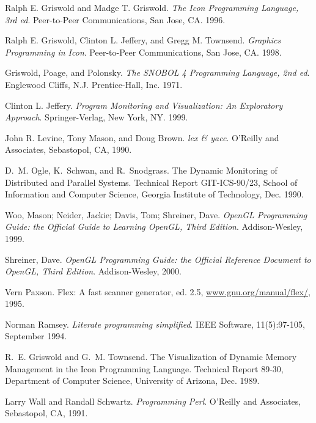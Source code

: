 \begin{thebibliography}{ABCD}
   Ralph E. Griswold and Madge T. Griswold.
    \emph{The Icon Programming Language, 3rd ed}. Peer-to-Peer Communications,
    San Jose, CA. 1996.

   Ralph E. Griswold, Clinton L. Jeffery, and Gregg
    M. Townsend. \emph{Graphics Programming in Icon}. Peer-to-Peer
    Communications, San Jose, CA. 1998.

   Griswold, Poage, and Polonsky.
    \emph{The SNOBOL 4 Programming Language, 2nd ed}.
    Englewood Cliffs, N.J. Prentice-Hall, Inc. 1971.

   Clinton L. Jeffery.
    \emph{Program Monitoring and Visualization: An Exploratory Approach}.
    Springer-Verlag, New York, NY. 1999.

   John R. Levine, Tony Mason, and Doug Brown.
    \emph{lex \& yacc}. O'Reilly and Associates, Sebastopol, CA, 1990.

D.~M. Ogle, K.~Schwan, and R.~Snodgrass.                                        
\newblock The {D}ynamic {M}onitoring of {D}istributed and {P}arallel {S}ystems. 
\newblock Technical Report GIT-ICS-90/23, School of Information and Computer    
  Science, Georgia Institute of Technology, Dec. 1990.

   Woo, Mason; Neider, Jackie; Davis, Tom; Shreiner, Dave.
    \emph{OpenGL Programming Guide: the Official Guide to Learning OpenGL, Third
      Edition}. Addison-Wesley, 1999.

   Shreiner, Dave.
   \emph{OpenGL Programming Guide: the Official
    Reference Document to OpenGL, Third Edition}.  Addison-Wesley, 2000.

   Vern Paxson. {Flex: A fast scanner generator, ed. 2.5},
    \url{www.gnu.org/manual/flex/}, 1995.

   Norman Ramsey. \emph{Literate programming simplified}.
    IEEE Software, 11(5):97-105, September 1994.

R.~E. Griswold and G.~M. Townsend.                                              
\newblock The {V}isualization of {D}ynamic {M}emory {M}anagement in the {I}con  
  {P}rogramming {L}anguage.                                                     
\newblock Technical Report 89-30, Department of Computer Science, University of 
  Arizona, Dec. 1989.

   Larry Wall and Randall Schwartz. \emph{Programming
    Perl}.  O'Reilly and Associates, Sebastopol, CA, 1991.

\end{thebibliography}
